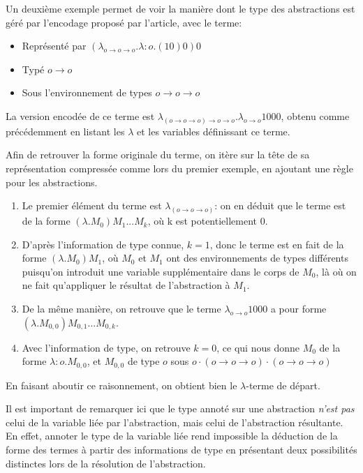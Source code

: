 \documentclass[titlepage]{article}
\providecommand{\tightlist}{%
  \setlength{\itemsep}{0pt}\setlength{\parskip}{0pt}}
\begin{document}
Un deuxième exemple permet de voir la manière dont le type des abstractions est géré
par l'encodage proposé par l'article, avec le terme:

\begin{itemize}
\tightlist
\item
  Représenté par $(\lambda_{o \rightarrow o \rightarrow o}.\lambda:o.(10)0)0$
\item
  Typé $o \rightarrow o$
\item
  Sous l'environnement de types $o \rightarrow o \rightarrow o$
\end{itemize}

La version encodée de ce terme est $\lambda_{(o \rightarrow o \rightarrow o) \rightarrow o \rightarrow o}.\lambda_{o \rightarrow o} 1 0 0 0$, obtenu comme
précédemment en listant les $\lambda$ et les variables définissant ce terme.

Afin de retrouver la forme originale du terme, on itère sur la tête de sa représentation
compressée comme lors du premier exemple, en ajoutant une règle pour les abstractions.

\begin{enumerate}
  \tightlist
  \item
    Le premier élément du terme est $\lambda_{(o \rightarrow o \rightarrow o)}$: on en déduit que le terme est de la forme $(\lambda.M_0)M_1...M_k$,
    où k est potentiellement 0.
  \item
    D'après l'information de type connue, $k = 1$, donc le terme est en fait de la forme $(\lambda.M_0)M_1$, où $M_0$ et $M_1$ ont des environnements de
    types différents puisqu'on introduit une variable supplémentaire dans le corps de $M_0$, là où on ne fait qu'appliquer le résultat de l'abstraction
    à $M_1$.
  \item
    De la même manière, on retrouve que le terme $\lambda_{o \rightarrow o} 1 0 0 0$ a pour forme $(\lambda.M_{0,0})M_{0,1}...M_{0,k}$.
  \item
    Avec l'information de type, on retrouve $k=0$, ce qui nous donne $M_0$ de la forme $\lambda:o.M_{0,0}$, et $M_{0,0}$ de type $o$ sous
    $o \cdot (o \rightarrow o \rightarrow o) \cdot (o \rightarrow o \rightarrow o)$
\end{enumerate}

En faisant aboutir ce raisonnement, on obtient bien le $\lambda$-terme de départ.

Il est important de remarquer ici que le type annoté sur une abstraction \emph{n'est pas} celui de la variable
liée par l'abstraction, mais celui de l'abstraction résultante. En effet, annoter le type de la variable liée
rend impossible la déduction de la forme des termes à partir des informations de type en présentant deux possibilités
distinctes lors de la résolution de l'abstraction.
\end{document}
